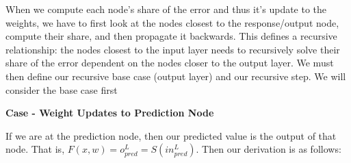 \documentclass[11pt]{article}
\begin{document}
\vspace{5 mm}
\noindent
When we compute each node's share of the error and thus it's update to the 
weights, we have to first look at the nodes closest to the response/output 
node, compute their share, and then propagate it backwards. This defines a 
recursive relationship: the nodes closest to the input layer needs to 
recursively solve their share of the error dependent on the nodes closer to 
the output layer. We must then define our recursive base case (output layer) 
and our recursive step. We will consider the base case first

\vspace{5 mm}
\noindent
\textbf{Case - Weight Updates to Prediction Node}

\vspace{5 mm}
\noindent
If we are at the prediction node, then our predicted value is the output of 
that node. That is, $F(x, w) = o_{pred}^{L} = S(in_{pred}^{L})$. Then our 
derivation is as follows:
\end{document}
